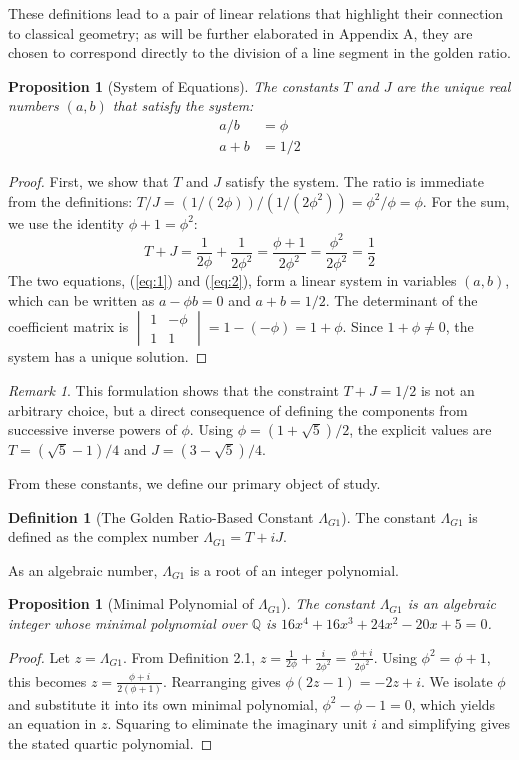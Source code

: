 \documentclass{amsart}
\theoremstyle{plain}
\newtheorem{proposition}[theorem]{Proposition}
\theoremstyle{definition}
\newtheorem{definition}[theorem]{Definition}
\theoremstyle{remark}
\newtheorem*{remark}{Remark}
\newcommand{\LambdaG}{\Lambda_{G1}}
\newcommand{\phiG}{\phi}
\begin{document}
These definitions lead to a pair of linear relations that highlight their connection to classical geometry; as will be further elaborated in Appendix A, they are chosen to correspond directly to the division of a line segment in the golden ratio.
\begin{proposition}[System of Equations]
The constants $T$ and $J$ are the unique real numbers $(a,b)$ that satisfy the system:
\begin{align}
    a/b &= \phiG \label{eq:1} \\
    a+b &= 1/2 \label{eq:2}
\end{align}
\end{proposition}
\begin{proof}
First, we show that $T$ and $J$ satisfy the system. The ratio is immediate from the definitions: $T/J = (1/(2\phiG))/(1/(2\phiG^2)) = \phiG^2/\phiG = \phiG$. For the sum, we use the identity $\phiG+1 = \phiG^2$:
\[ T+J = \frac{1}{2\phiG} + \frac{1}{2\phiG^2} = \frac{\phiG+1}{2\phiG^2} = \frac{\phiG^2}{2\phiG^2} = \frac{1}{2} \] 
The two equations, (\ref{eq:1}) and (\ref{eq:2}), form a linear system in variables $(a,b)$, which can be written as $a - \phiG b = 0$ and $a+b=1/2$. The determinant of the coefficient matrix is $\begin{vmatrix} 1 & -\phiG \\ 1 & 1 \end{vmatrix} = 1 - (-\phiG) = 1+\phiG$. Since $1+\phiG \neq 0$, the system has a unique solution.
\end{proof}

\begin{remark}
This formulation shows that the constraint $T+J=1/2$ is not an arbitrary choice, but a direct consequence of defining the components from successive inverse powers of $\phiG$. Using $\phiG = (1+\sqrt{5})/2$, the explicit values are $T = (\sqrt{5}-1)/4$ and $J = (3-\sqrt{5})/4$.
\end{remark}

From these constants, we define our primary object of study.
\begin{definition}[The Golden Ratio-Based Constant \texorpdfstring{$\LambdaG$}{Lambda\_G1}]
The constant $\LambdaG$ is defined as the complex number $\LambdaG = T+iJ$.
\end{definition}

As an algebraic number, $\LambdaG$ is a root of an integer polynomial.
\begin{proposition}[Minimal Polynomial of \texorpdfstring{$\LambdaG$}{Lambda\_G1}]
The constant $\LambdaG$ is an algebraic integer whose minimal polynomial over $\mathbb{Q}$ is $16x^4 + 16x^3 + 24x^2 - 20x + 5 = 0$.
\end{proposition}
\begin{proof}
Let $z = \LambdaG$. From Definition 2.1, $z = \frac{1}{2\phiG} + \frac{i}{2\phiG^2} = \frac{\phiG+i}{2\phiG^2}$. Using $\phiG^2=\phiG+1$, this becomes $z = \frac{\phiG+i}{2(\phiG+1)}$. Rearranging gives $\phiG(2z-1) = -2z+i$. We isolate $\phiG$ and substitute it into its own minimal polynomial, $\phiG^2-\phiG-1=0$, which yields an equation in $z$. Squaring to eliminate the imaginary unit $i$ and simplifying gives the stated quartic polynomial.
\end{proof}
\end{document}
